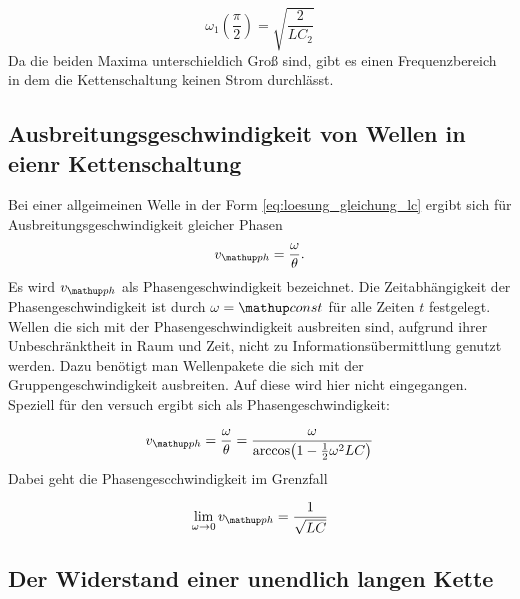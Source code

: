 \begin{equation}
\label{eq:max_omega_1_ceins_czwei}
\omega_1(\frac{\pi}{2})=\sqrt{\frac{2}{LC_2}}
\end{equation}
Da die beiden Maxima unterschieldich Groß sind, gibt es einen Frequenzbereich
in dem die Kettenschaltung keinen Strom durchlässt.
\subsection{Ausbreitungsgeschwindigkeit von Wellen in eienr Kettenschaltung}
Bei einer allgeimeinen Welle in der Form \eqref{eq:loesung_gleichung_lc}
ergibt sich für Ausbreitungsgeschwindigkeit gleicher Phasen
\begin{equation*}
v\ua{ph}=\frac{\omega}{\theta}.
\end{equation*}
Es wird $v\ua{ph}$ als Phasengeschwindigkeit bezeichnet.
Die Zeitabhängigkeit der Phasengeschwindigkeit ist durch $\omega=\map{const}$ 
für alle Zeiten $t$ festgelegt. Wellen die sich mit der Phasengeschwindigkeit
ausbreiten sind, aufgrund ihrer Unbeschränktheit in Raum und Zeit, nicht zu
Informationsübermittlung genutzt werden. Dazu benötigt man Wellenpakete die sich 
mit der Gruppengeschwindigkeit ausbreiten. Auf diese wird hier nicht eingegangen.
Speziell für den versuch ergibt sich als Phasengeschwindigkeit:

\begin{equation}
\label{eq:phasen_esc}
v\ua{ph}=\frac{\omega}{\theta}=\frac{\omega}{\arccos\!\left(1-\frac{1}{2}\omega^2LC\right)}
\end{equation}
Dabei geht die Phasengescchwindigkeit im Grenzfall

\begin{equation*}
\lim_{\omega\to 0}v\ua{ph}=\frac{1}{\sqrt{LC}}
\end{equation*}

\subsection{Der Widerstand einer unendlich langen Kette}